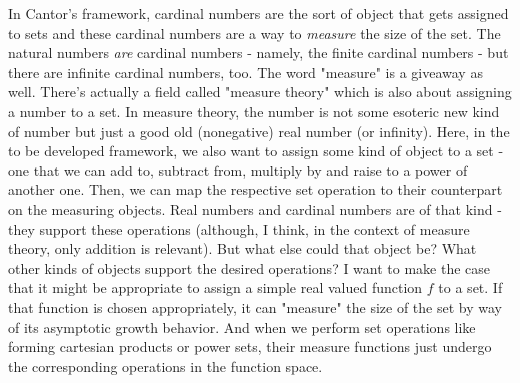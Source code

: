 \documentclass[12pt]{article}
\begin{document}
In Cantor's framework, cardinal numbers are the sort of object that gets assigned to sets and these cardinal numbers are a way to \emph{measure} the size of the set. The natural numbers \emph{are} cardinal numbers - namely, the finite cardinal numbers - but there are infinite cardinal numbers, too. The word "measure" is a giveaway as well. There's actually a field called "measure theory" which is also about assigning a number to a set. In measure theory, the number is not some esoteric new kind of number but just a good old (nonegative) real number (or infinity). Here, in the to be developed framework, we also want to assign some kind of object to a set - one that we can add to, subtract from, multiply by and raise to a power of another one. Then, we can map the respective set operation to their counterpart on the measuring objects. Real numbers and cardinal numbers are of that kind - they support these operations (although, I think, in the context of measure theory, only addition is relevant). But what else could that object be? What other kinds of objects support the desired operations? I want to make the case that it might be appropriate to assign a simple real valued function $f$ to a set. If that function is chosen appropriately, it can "measure" the size of the set by way of its asymptotic growth behavior. And when we perform set operations like forming cartesian products or power sets, their measure functions just undergo the corresponding operations in the function space. %



\end{document}
